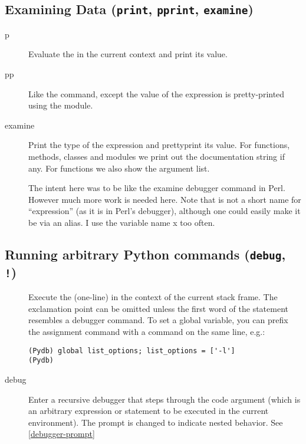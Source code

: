 \subsection{Examining Data ({\tt print}, {\tt pprint}, {\tt examine})\label{subsection:data}}

\begin{description}

\item[p ]

Evaluate the  in the current context and print its
value.  

\item[pp ]

Like the  command, except the value of the expression is
pretty-printed using the  module.

\item[examine ]

Print the type of the expression and prettyprint its value.  For
functions, methods, classes and modules we print out the documentation
string if any.  For functions we also show the argument list.

The intent here was to be like the examine debugger command in
Perl. However much more work is needed here. Note that  is not
a short name for ``expression'' (as it is in Perl's debugger),
although one could easily make it be via an alias. I use the variable
name x too often.

\end{description}

\subsection{Running arbitrary Python commands ({\tt debug}, {\tt !})}

\begin{description}

\item[\optional{!}]

Execute the (one-line)  in the context of
the current stack frame.
The exclamation point can be omitted unless the first word
of the statement resembles a debugger command.
To set a global variable, you can prefix the assignment
command with a  command on the same line, e.g.:

\begin{verbatim}
(Pydb) global list_options; list_options = ['-l']
(Pydb)
\end{verbatim}

\item[debug ]

Enter a recursive debugger that steps through the code argument (which
is an arbitrary expression or statement to be executed in the current
environment). The prompt is changed to indicate nested behavior. See
\ref{debugger-prompt}

\end{description}

